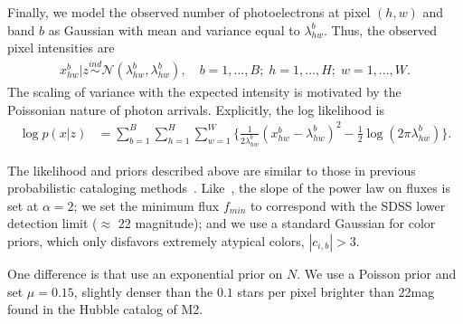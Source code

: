 Finally, we model the observed number of photoelectrons at pixel $(h,w)$ and band $b$ as Gaussian
with mean and variance equal to $\lambda^b_{hw}$. 
Thus, the observed pixel intensities are
\begin{align}
  x_{hw}^b | z \overset{ind}{\sim} \mathcal{N}(\lambda^b_{hw}, \lambda^b_{hw}),
  \quad 
  b = 1, ..., B; \;
  h = 1,..., H; \; 
  w = 1, ..., W. 
\end{align}
The scaling of variance with the expected intensity is motivated by the Poissonian nature of photon arrivals. 
Explicitly, the log likelihood is
\begin{align}
    \log p(x | z) &= \sum_{b = 1}^{B} \sum_{h = 1}^H \sum_{w = 1}^W 
        \Big\{\frac{1}{2\lambda^b_{hw}}(x_{hw}^b  - \lambda^b_{hw})^2 - 
               \frac{1}{2}\log(2\pi\lambda^b_{hw})\Big\}
    \label{eq:loglik}.
\end{align}

The likelihood and priors described above are similar to those
in previous probabilistic cataloging methods~\cite{Brewer_2013, Portillo_2017, Feder_2019, regier2019_celeste}. Like~\cite{Portillo_2017, Feder_2019}, the slope of the power law on fluxes is set at  $\alpha = 2$; we set the minimum flux $f_{min}$ to correspond with the SDSS 
lower detection limit ($\approx$ 22 magnitude); and we use a standard Gaussian for color priors, which only disfavors extremely atypical colors, $|c_{i,b}| > 3$. 

One difference is that \cite{Portillo_2017, Feder_2019} use an exponential prior on $N$. We use a Poisson prior and set $\mu = 0.15$, slightly denser than the $0.1$ stars per pixel 
brighter than 22mag found in the Hubble catalog of M2. 

